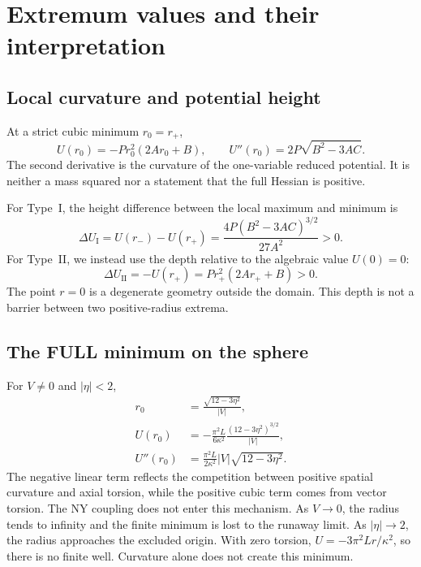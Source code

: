 \section{Extremum values and their interpretation}\label{sec5}
\subsection{Local curvature and potential height}
At a strict cubic minimum $r_0=r_+$,
\begin{equation}
U(r_0)=-P r_0^2(2Ar_0+B),\qquad
U''(r_0)=2P\sqrt{B^2-3AC}.
\tag{M5-01}\label{eq:M5-01}
\end{equation}
The second derivative is the curvature of the one-variable reduced
potential. It is neither a mass squared nor a statement that the full
Hessian is positive.

For Type~I, the height difference between the local maximum and minimum is
\begin{equation}
\Delta U_{\mathrm I}
=U(r_-)-U(r_+)
=\frac{4P(B^2-3AC)^{3/2}}{27A^2}>0.
\tag{M5-02}\label{eq:M5-02}
\end{equation}
For Type~II, we instead use the depth relative to the algebraic value
$U(0)=0$:
\begin{equation}
\Delta U_{\mathrm{II}}
=-U(r_+)
=P r_+^2(2Ar_++B)>0.
\tag{M5-03}\label{eq:M5-03}
\end{equation}
The point $r=0$ is a degenerate geometry outside the domain.
This depth is not a barrier between two positive-radius extrema.

\subsection{The FULL minimum on the sphere}
For $V\ne0$ and $|\eta|<2$,
\begin{equation}
\begin{aligned}
r_0&=\frac{\sqrt{12-3\eta^2}}{\lvert V\rvert},\\
U(r_0)&=-\frac{\pi^2L}{6\kappa^2}
        \frac{(12-3\eta^2)^{3/2}}{\lvert V\rvert},\\
U''(r_0)&=\frac{\pi^2L}{2\kappa^2}
          \lvert V\rvert\sqrt{12-3\eta^2}.
\end{aligned}
\tag{M5-04}\label{eq:M5-04}
\end{equation}
The negative linear term reflects the competition between positive
spatial curvature and axial torsion, while the positive cubic term
comes from vector torsion. The NY coupling does not enter this mechanism.
As $V\to0$, the radius tends to infinity and the finite minimum is lost
to the runaway limit. As $|\eta|\to2$, the radius approaches the excluded
origin. With zero torsion,
$U=-3\pi^2Lr/\kappa^2$, so there is no finite well.
Curvature alone does not create this minimum.

